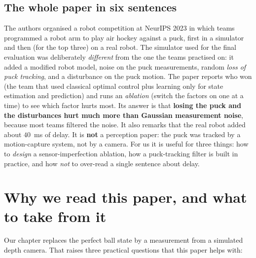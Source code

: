 \documentclass[11pt,a4paper]{article}
\begin{document}
\subsection*{The whole paper in six sentences}
The authors organised a robot competition at NeurIPS 2023 in which teams programmed a robot arm to
play air hockey against a puck, first in a simulator and then (for the top three) on a real
robot. The simulator used for the final evaluation was deliberately \emph{different} from the one
the teams practised on: it added a modified robot model, noise on the puck measurements, random
\emph{loss of puck tracking}, and a disturbance on the puck motion. The paper reports who won
(the team that used classical optimal control plus learning only for state estimation and
prediction) and runs an \emph{ablation} (switch the factors on one at a time) to see which
factor hurts most. Its answer is that \textbf{losing the puck and the disturbances hurt much more
than Gaussian measurement noise}, because most teams filtered the noise. It also remarks that
the real robot added about $40$~ms of delay. It is \textbf{not} a perception paper: the puck was
tracked by a motion-capture system, not by a camera. For us it is useful for three things: how to
\emph{design} a sensor-imperfection ablation, how a puck-tracking filter is built in practice, and
how \emph{not} to over-read a single sentence about delay.

\tableofcontents
\newpage

\section{Why we read this paper, and what to take from it}

Our chapter replaces the perfect ball state by a measurement from a simulated depth camera. That
raises three practical questions that this paper helps with:
\end{document}
